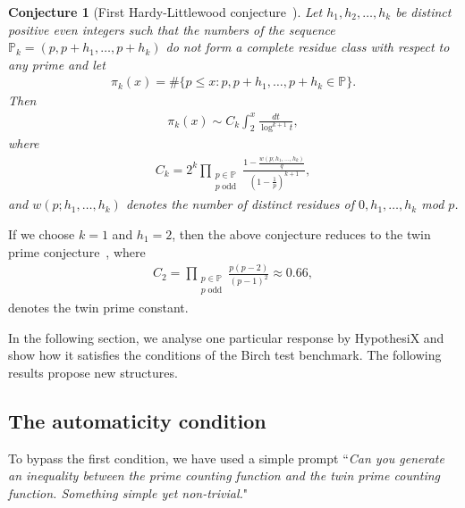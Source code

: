 \documentclass[11pt,reqno]{amsart}
\theoremstyle{plain}\newtheorem{theorem}{Theorem}[section]
\newtheorem{conjecture}{Conjecture}[section]
\numberwithin{equation}{section}
\begin{document}
\begin{conjecture}[First Hardy-Littlewood conjecture~\cite{hardylittlewood}]\label{hardylittewood}
Let $h_1,h_2,\ldots,h_k$ be distinct positive even integers such that the numbers of the sequence $\mathbb{P}_k=(p,p+h_1,\ldots,p+h_k)$ do not form a complete residue class with respect to any prime and let
\begin{align}\label{generalisedprimecountingfunction}
\pi_k(x)=\#\{p\leq x: p,p+h_1,\ldots,p+h_k\in\mathbb{P}\}.   
\end{align}
Then
\begin{align*}
\pi_k(x)
\sim C_k\int_{2}^{x}\frac{dt}{\log^{k+1}t},
\end{align*}
where
\begin{align}\label{ktupleconstant}
C_k
=2^k\prod_{\substack{p\in\mathbb{P}\\p\;\mathrm{odd}}}\frac{1-\frac{w(p;h_1,\ldots,h_k)}{q}}{\left(1-\frac{1}{p}\right)^{k+1}},
\end{align}
and $w(p;h_1,\ldots,h_k)$ denotes the number of distinct residues of $0,h_1,\ldots,h_k$ mod $p$.
\end{conjecture}

\medskip
\noindent
If we choose $k=1$ and $h_1=2$, then the above conjecture reduces to the twin prime conjecture~\cite{James1}, where 
\begin{align}\label{twinprimeconstant}
C_2=\prod_{\substack{p\in\mathbb{P}\\p\;\mathrm{odd}}}\frac{p(p-2)}{(p-1)^2}\approx0.66,   
\end{align}
denotes the twin prime constant. 


In the following section, we analyse one particular response by HypothesiX and show how it satisfies the conditions of the Birch test benchmark. The following results propose new structures.


\subsection{The automaticity condition}\label{selectedinequalities}

To bypass the first condition, we have used a simple prompt ``{\it Can you generate an inequality between the prime counting function and the twin prime counting function. Something simple yet non-trivial.}" 
\end{document}
